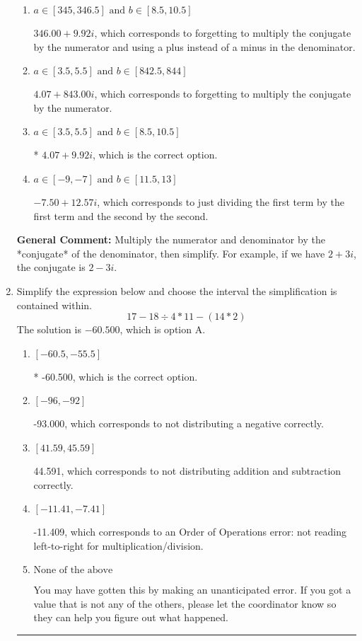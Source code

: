 \documentclass{extbook}[14pt]
\newcommand{\litem}[1]{\item #1

\rule{\textwidth}{0.4pt}}
\begin{document}
\begin{enumerate}
{\begin{enumerate}[label=\Alph*.]
 $-10.42  + 2.51 i$, which corresponds to forgetting to multiply the conjugate by the numerator and not computing the conjugate correctly.
\item \( a \in [345, 346.5] \text{ and } b \in [8.5, 10.5] \)

 $346.00  + 9.92 i$, which corresponds to forgetting to multiply the conjugate by the numerator and using a plus instead of a minus in the denominator.
\item \( a \in [3.5, 5.5] \text{ and } b \in [842.5, 844] \)

 $4.07  + 843.00 i$, which corresponds to forgetting to multiply the conjugate by the numerator.
\item \( a \in [3.5, 5.5] \text{ and } b \in [8.5, 10.5] \)

* $4.07  + 9.92 i$, which is the correct option.
\item \( a \in [-9, -7] \text{ and } b \in [11.5, 13] \)

 $-7.50  + 12.57 i$, which corresponds to just dividing the first term by the first term and the second by the second.
\end{enumerate}

\textbf{General Comment:} Multiply the numerator and denominator by the *conjugate* of the denominator, then simplify. For example, if we have $2+3i$, the conjugate is $2-3i$.
}
\litem{
Simplify the expression below and choose the interval the simplification is contained within.
\[ 17 - 18 \div 4 * 11 - (14 * 2) \]The solution is \( -60.500 \), which is option A.\begin{enumerate}[label=\Alph*.]
\item \( [-60.5, -55.5] \)

* -60.500, which is the correct option.
\item \( [-96, -92] \)

 -93.000, which corresponds to not distributing a negative correctly.
\item \( [41.59, 45.59] \)

 44.591, which corresponds to not distributing addition and subtraction correctly.
\item \( [-11.41, -7.41] \)

 -11.409, which corresponds to an Order of Operations error: not reading left-to-right for multiplication/division.
\item \( \text{None of the above} \)

 You may have gotten this by making an unanticipated error. If you got a value that is not any of the others, please let the coordinator know so they can help you figure out what happened.
\end{enumerate}

}
\end{enumerate}
\end{document}
